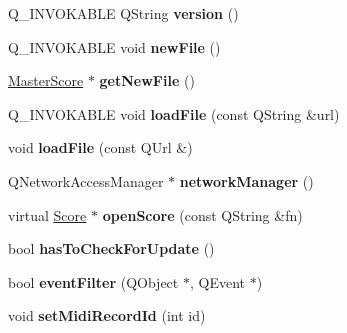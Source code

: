 \begin{DoxyCompactItemize}
Q\+\_\+\+I\+N\+V\+O\+K\+A\+B\+LE Q\+String {\bfseries version} ()
\item 
\mbox{\label{class_ms_1_1_muse_score_abd7b80c152d6709b965c4bc72b50efb3}} 
Q\+\_\+\+I\+N\+V\+O\+K\+A\+B\+LE void {\bfseries new\+File} ()
\item 
\mbox{\label{class_ms_1_1_muse_score_ac41c16177e26d54c6a7d0376d0939c2c}} 
\hyperlink{class_ms_1_1_master_score}{Master\+Score} $\ast$ {\bfseries get\+New\+File} ()
\item 
\mbox{\label{class_ms_1_1_muse_score_aee1d1435102d2ee07dc32a27cc237509}} 
Q\+\_\+\+I\+N\+V\+O\+K\+A\+B\+LE void {\bfseries load\+File} (const Q\+String \&url)
\item 
\mbox{\label{class_ms_1_1_muse_score_a3f0808ca87fd261d12a878564ee2a80b}} 
void {\bfseries load\+File} (const Q\+Url \&)
\item 
\mbox{\label{class_ms_1_1_muse_score_a0da1b3d9701edd39f5f79f70346fa02e}} 
Q\+Network\+Access\+Manager $\ast$ {\bfseries network\+Manager} ()
\item 
\mbox{\label{class_ms_1_1_muse_score_a203f98086aa3940b2f8f415f070d4146}} 
virtual \hyperlink{class_ms_1_1_score}{Score} $\ast$ {\bfseries open\+Score} (const Q\+String \&fn)
\item 
\mbox{\label{class_ms_1_1_muse_score_aa16f393c4234811c34e4c6d20fdfa7a6}} 
bool {\bfseries has\+To\+Check\+For\+Update} ()
\item 
\mbox{\label{class_ms_1_1_muse_score_a96fccaddbb42273527f8288ae83ab2e1}} 
bool {\bfseries event\+Filter} (Q\+Object $\ast$, Q\+Event $\ast$)
\item 
\mbox{\label{class_ms_1_1_muse_score_adc9004cdd24577091b79bd8160af39de}} 
void {\bfseries set\+Midi\+Record\+Id} (int id)
\item 
\mbox{\label{class_ms_1_1_muse_score_ae75f8133cf94e8c156bf505f1fb502b8}} 

\end{DoxyCompactItemize}
